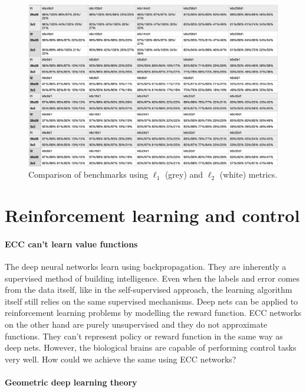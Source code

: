 \documentclass[12pt]{article}
\begin{document}
\begin{figure}[!htbp]
	\centering
	\includegraphics[width=13.8cm]{benchmarks_l2}
	\caption{Comparison of benchmarks using $\ell_1$ (grey) and $\ell_2$ (white) metrics.}
	\label{fig:benchmarks_l2}
\end{figure}

 
\section{Reinforcement learning and control}

\paragraph{ECC can't learn value functions}

The deep neural networks learn using backpropagation. They are inherently a supervised method of building intelligence. Even when the labels and error comes from the data itself, like in the self-supervised approach, the learning algorithm itself still relies on the same supervised mechanisms. Deep nets can be applied to reinforcement learning problems by modelling the reward function. ECC networks on the other hand are purely unsupervised and they do not approximate functions. They can't represent policy or reward function in the same way as deep nets. However, the biological brains are capable of performing control tasks very well. How could we achieve the same using ECC networks?

\paragraph{Geometric deep learning theory}
\end{document}
